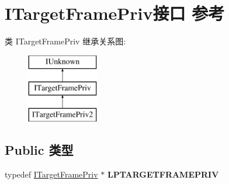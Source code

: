 \hypertarget{interface_i_target_frame_priv}{}\section{I\+Target\+Frame\+Priv接口 参考}
\label{interface_i_target_frame_priv}
类 I\+Target\+Frame\+Priv 继承关系图\+:\begin{figure}[H]
\begin{center}
\leavevmode
\includegraphics[height=3.000000cm]{interface_i_target_frame_priv}
\end{center}
\end{figure}
\subsection*{Public 类型}
\begin{DoxyCompactItemize}
\item 
\mbox{\label{interface_i_target_frame_priv_a2352fe9e07d04284db6e81fd543cbd03}} 
typedef \hyperlink{interface_i_target_frame_priv}{I\+Target\+Frame\+Priv} $\ast$ {\bfseries L\+P\+T\+A\+R\+G\+E\+T\+F\+R\+A\+M\+E\+P\+R\+IV}
\end{DoxyCompactItemize}

